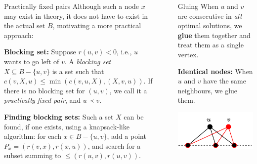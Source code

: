 \documentclass[final]{beamer}
\newlength{\sepwidth}
\newlength{\colwidth}
\newcommand{\separatorcolumn}{\begin{column}{\sepwidth}\end{column}}
\theoremstyle{remark}
\renewcommand{\b}{\prec}
\newcommand{\be}{\preceq}
\begin{document}
\begin{frame}[t]
\begin{columns}[t]
\begin{column}{\colwidth}
      \begin{block}{Practically fixed pairs}
        Although such a node $x$ may exist in theory, it does
        not have to exist in the actual set $B$, motivating a more practical approach:

        \textbf{Blocking set:}
        Suppose $r(u,v)< 0$, i.e., $u$ wants to go left of $v$.
        A \emph{blocking set} $X\subseteq B-\{u,v\}$ is a set such that $c(v,X,u) \leq \min(c(v, u,
        X), (X, v, u))$.  If there is no blocking set for $(u, v)$, we call it a
        \emph{practically fixed pair}, and $u\b v$.
      \end{block}

      \textbf{Finding blocking sets:}
      Such a set $X$ can be found, if one exists, using a knapsack-like algorithm: for
      each $x\in B-\{u,v\}$, add a point $P_x = (r(v, x), r(x, u))$, and search for a subset summing
      to ${\leq{}(r(u, v), r(u, v))}$.


    \end{column}

    \separatorcolumn

    \begin{column}{\colwidth}
      \begin{block}{Gluing}
        When $u$ and $v$ are consecutive in \emph{all} optimal solutions,
        we \textbf{glue} them together and treat them as a single vertex.

        \textbf{Identical nodes:}
        When $u$ and $v$ have the same neighbours, we glue them.

        \begin{center}
          \vspace{-1em}
        \includegraphics[scale=2]{fig/gluing.pdf}
        \end{center}


\end{block}
\end{column}
\end{columns}
\end{frame}
\end{document}
